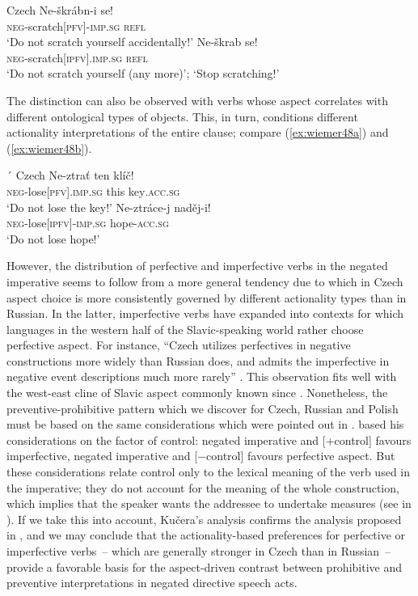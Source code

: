 \documentclass[output=paper,colorlinks,citecolor=brown]{langscibook}
\begin{document}
\ea \textnormal{Czech}
\label{ex:wiemer47}
\ea \label{ex:wiemer47a}
\gll Ne-škrábn-i se! \\
\textsc{neg}-scratch\textsc{[pfv]-imp.sg} \textsc{refl} \\
\glt `Do not scratch yourself accidentally!'
\ex \label{ex:wiemer47b}
\gll Ne-škrab se! \\
\textsc{neg}-scratch\textsc{[ipfv].imp.sg} \textsc{refl} \\
\glt `Do not scratch yourself (any more)'; `Stop scratching!'
\z
\z


 The distinction can also be observed with verbs whose aspect correlates with different ontological types of objects. This, in turn, conditions different actionality interpretations of the entire clause; compare (\ref{ex:wiemer48a}) and (\ref{ex:wiemer48b}).


\newpage´
\ea \textnormal{Czech}
\label{ex:wiemer48} 
\ea \label{ex:wiemer48a}
\gll Ne-ztrať ten klíč! \\
\textsc{neg}-lose\textsc{[pfv].imp.sg} this key\textsc{.acc.sg} \\
\glt `Do not lose the key!'
\ex \label{ex:wiemer48b}
\gll Ne-ztráce-j naděj-i! \\
\textsc{neg}-lose\textsc{[ipfv]-imp.sg} hope-\textsc{acc.sg} \\
\glt `Do not lose hope!'
\z
\z


 However, the distribution of perfective and imperfective verbs in the negated imperative seems to follow from a more general tendency due to which in Czech aspect choice is more consistently governed by different actionality types than in Russian. In the latter, imperfective verbs have expanded into contexts for which languages in the western half of the Slavic-speaking world rather choose perfective aspect. For instance, ``Czech utilizes perfectives in negative constructions more widely than Russian does, and admits the imperfective in negative event descriptions much more rarely'' \citep[118]{Kučera1984}. This observation fits well with the west-east cline of Slavic aspect commonly known since \citet{Dickey2000}. Nonetheless, the preventive-prohibitive pattern which we discover for Czech, Russian and Polish must be based on the same considerations which were pointed out in . \citet{Kučera1984} based his considerations on the factor of control: negated imperative and [+control] favours imperfective, negated imperative and [−control] favours perfective aspect. But these considerations relate control only to the lexical meaning of the verb used in the imperative; they do not account for the meaning of the whole construction, which implies that the speaker wants the addressee to undertake measures (see  in ). If we take this into account, Kučera's analysis confirms the analysis proposed in , and we may conclude that the actionality-based preferences for perfective or imperfective verbs~– which are generally stronger in Czech than in Russian~– provide a favorable basis for the aspect-driven contrast between prohibitive and preventive interpretations in negated directive speech acts.
\end{document}
